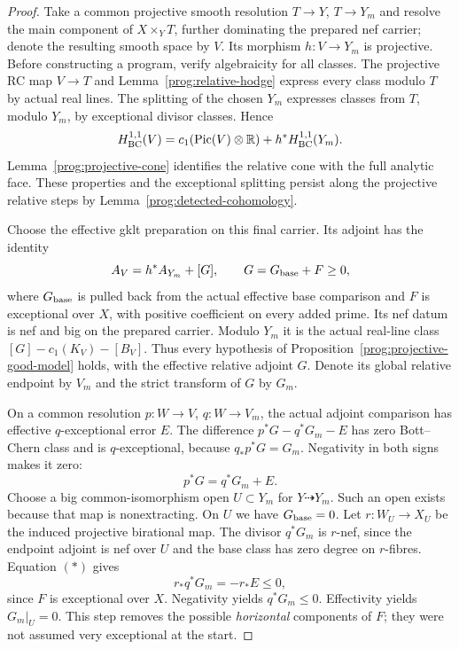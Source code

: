 \begin{proof}
Take a common projective smooth resolution $T\to Y$, $T\to Y_m$
and resolve the main component of $X\times_Y T$, further dominating
the prepared nef carrier; denote the resulting smooth space by $V$.
Its morphism $h:V\to Y_m$ is projective. Before constructing a
program, verify algebraicity for all classes. The projective RC map
$V\to T$ and Lemma~\ref{prog:relative-hodge} express every class
modulo $T$ by actual real lines. The splitting of the chosen $Y_m$
expresses classes from $T$, modulo $Y_m$, by exceptional divisor
classes. Hence
\[
 H^{1,1}_{\rm BC}(V)=c_1(\operatorname{Pic}(V)\otimes\mathbb R)
                         +h^*H^{1,1}_{\rm BC}(Y_m).
\]
Lemma~\ref{prog:projective-cone} identifies the relative cone
with the full analytic face. These properties and the exceptional
splitting persist along the projective relative steps by
Lemma~\ref{prog:detected-cohomology}.

Choose the effective gklt preparation on this final carrier. Its
adjoint has the identity
\[
 A_V=h^*A_{Y_m}+[G],\qquad G=G_{\rm base}+F\geq0,
\]
where $G_{\rm base}$ is pulled back from the actual effective base
comparison and $F$ is exceptional over $X$, with positive coefficient
on every added prime. Its nef datum is nef and big on the prepared
carrier. Modulo $Y_m$ it is the actual real-line class
$[G]-c_1(K_V)-[B_V]$. Thus every hypothesis of
Proposition~\ref{prog:projective-good-model} holds, with the effective
relative adjoint $G$. Denote its global relative endpoint by $V_m$
and the strict transform of $G$ by $G_m$.

On a common resolution $p:W\to V$, $q:W\to V_m$, the actual adjoint
comparison has effective $q$-exceptional error $E$. The difference
$p^*G-q^*G_m-E$ has zero Bott--Chern class and is $q$-exceptional,
because $q_*p^*G=G_m$. Negativity in both signs makes it zero:
\[
 p^*G=q^*G_m+E.                                      \tag{*}
\]
Choose a big common-isomorphism open $U\subset Y_m$ for
$Y\dashrightarrow Y_m$. Such an open exists because that map is
nonextracting. On $U$ we have $G_{\rm base}=0$. Let
$r:W_U\to X_U$ be the induced projective birational map. The divisor
$q^*G_m$ is $r$-nef, since the endpoint adjoint is nef over $U$ and
the base class has zero degree on $r$-fibres. Equation $(*)$ gives
\[
 r_*q^*G_m=-r_*E\leq0,
\]
since $F$ is exceptional over $X$. Negativity yields $q^*G_m\leq0$.
Effectivity yields $G_m|_U=0$. This step removes the possible
\emph{horizontal} components of $F$; they were not assumed very
exceptional at the start.


\end{proof}
